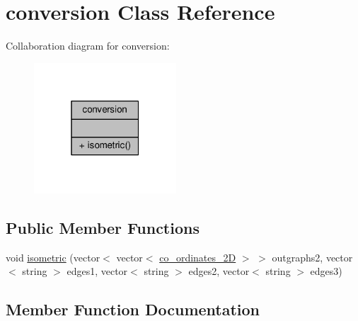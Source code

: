 \hypertarget{classconversion}{}\section{conversion Class Reference}
\label{classconversion}


Collaboration diagram for conversion\+:
\nopagebreak
\begin{figure}[H]
\begin{center}
\leavevmode
\includegraphics[width=151pt]{classconversion__coll__graph}
\end{center}
\end{figure}
\subsection*{Public Member Functions}
\begin{DoxyCompactItemize}
\item 
void \hyperlink{classconversion_a93f96b765225a746670f804db64416fc}{isometric} (vector$<$ vector$<$ \hyperlink{structco__ordinates__2D}{co\+\_\+ordinates\+\_\+2D} $>$ $>$ outgraphs2, vector$<$ string $>$ edges1, vector$<$ string $>$ edges2, vector$<$ string $>$ edges3)
\end{DoxyCompactItemize}


\subsection{Member Function Documentation}
